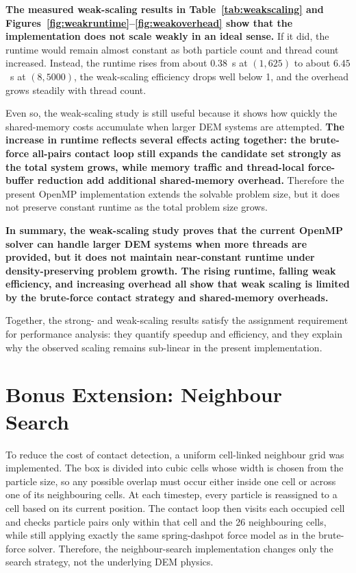 \documentclass[conference]{IEEEtran}
\begin{document}
\textbf{The measured weak-scaling results in Table~\ref{tab:weakscaling} and Figures~\ref{fig:weakruntime}--\ref{fig:weakoverhead} show that the implementation does not scale weakly in an ideal sense.} If it did, the runtime would remain almost constant as both particle count and thread count increased. Instead, the runtime rises from about $0.38$~s at $(1,625)$ to about $6.45$~s at $(8,5000)$, the weak-scaling efficiency drops well below 1, and the overhead grows steadily with thread count.

Even so, the weak-scaling study is still useful because it shows how quickly the shared-memory costs accumulate when larger DEM systems are attempted. \textbf{The increase in runtime reflects several effects acting together: the brute-force all-pairs contact loop still expands the candidate set strongly as the total system grows, while memory traffic and thread-local force-buffer reduction add additional shared-memory overhead.} Therefore the present OpenMP implementation extends the solvable problem size, but it does not preserve constant runtime as the total problem size grows.

\textbf{In summary, the weak-scaling study proves that the current OpenMP solver can handle larger DEM systems when more threads are provided, but it does not maintain near-constant runtime under density-preserving problem growth. The rising runtime, falling weak efficiency, and increasing overhead all show that weak scaling is limited by the brute-force contact strategy and shared-memory overheads.}

Together, the strong- and weak-scaling results satisfy the assignment requirement for performance analysis: they quantify speedup and efficiency, and they explain why the observed scaling remains sub-linear in the present implementation.

\section{Bonus Extension: Neighbour Search}
To reduce the cost of contact detection, a uniform cell-linked neighbour grid was implemented. The box is divided into cubic cells whose width is chosen from the particle size, so any possible overlap must occur either inside one cell or across one of its neighbouring cells. At each timestep, every particle is reassigned to a cell based on its current position. The contact loop then visits each occupied cell and checks particle pairs only within that cell and the 26 neighbouring cells, while still applying exactly the same spring-dashpot force model as in the brute-force solver. Therefore, the neighbour-search implementation changes only the search strategy, not the underlying DEM physics.
\end{document}
